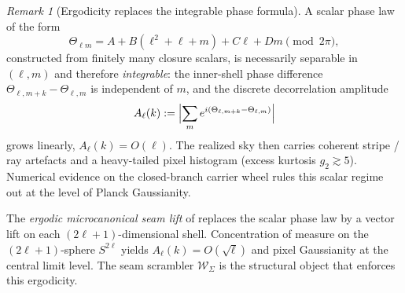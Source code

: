 \documentclass[11pt,a4paper]{article}
\theoremstyle{definition}
\theoremstyle{remark}
\newtheorem*{remark}{Remark}
\begin{document}
\begin{remark}[Ergodicity replaces the integrable phase formula]
\label{rem:ergodic-vs-scalar}
A scalar phase law of the form
\[
\Theta_{\ell m}=A+B(\ell^2+\ell+m)+C\ell+Dm\pmod{2\pi},
\]
constructed from finitely many closure scalars, is necessarily separable in $(\ell,m)$ and
therefore \emph{integrable}: the inner-shell phase difference
$\Theta_{\ell,m+k}-\Theta_{\ell,m}$ is independent of $m$, and the discrete decorrelation
amplitude
\[
A_\ell(k):=\Bigl|\sum_{m}e^{i(\Theta_{\ell,m+k}-\Theta_{\ell,m})}\Bigr|
\]
grows linearly, $A_\ell(k)=O(\ell)$. The realized sky then carries coherent stripe / ray
artefacts and a heavy-tailed pixel histogram (excess kurtosis $g_2\gtrsim 5$). Numerical evidence
on the closed-branch carrier wheel rules this scalar regime out at the level of Planck Gaussianity.

The \emph{ergodic microcanonical seam lift} of  replaces the
scalar phase law by a vector lift on each $(2\ell+1)$-dimensional shell. Concentration of measure
on the $(2\ell+1)$-sphere $S^{2\ell}$ yields $A_\ell(k)=O(\sqrt{\ell})$ and pixel Gaussianity at the
central limit level. The seam scrambler $\mathcal W_\Sigma$ is the structural object that
enforces this ergodicity.
\end{remark}
\end{document}
